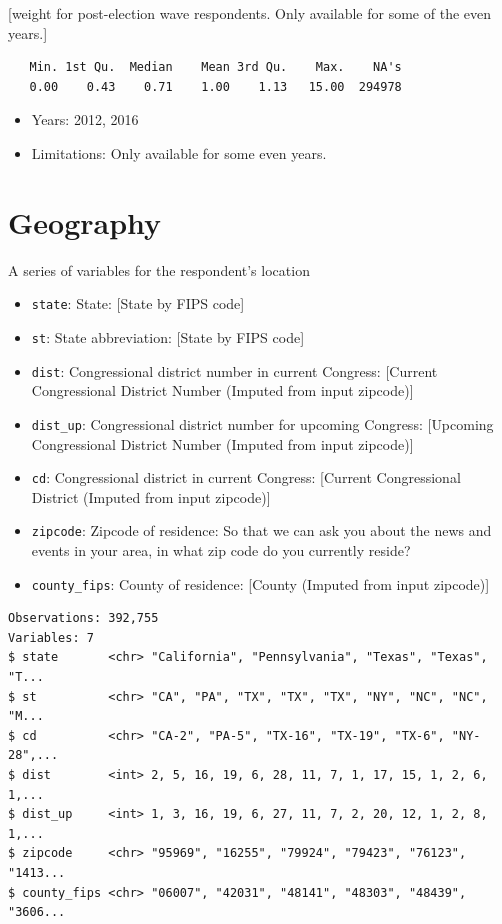 \documentclass[10pt,article,oneside]{memoir}
\theoremstyle{definition}
\begin{document}
{[}weight for post-election wave respondents. Only available for some of
the even years.{]}

\begin{verbatim}
   Min. 1st Qu.  Median    Mean 3rd Qu.    Max.    NA's 
   0.00    0.43    0.71    1.00    1.13   15.00  294978 
\end{verbatim}

\begin{itemize}
\tightlist
\item
  Years: 2012, 2016
\item
  Limitations: Only available for some even years.
\end{itemize}

\section{Geography}\label{geography}

A series of variables for the respondent's location

\begin{itemize}
\tightlist
\item
  \texttt{state}: State: {[}State by FIPS code{]}
\item
  \texttt{st}: State abbreviation: {[}State by FIPS code{]}
\item
  \texttt{dist}: Congressional district number in current Congress:
  {[}Current Congressional District Number (Imputed from input
  zipcode){]}
\item
  \texttt{dist\_up}: Congressional district number for upcoming
  Congress: {[}Upcoming Congressional District Number (Imputed from
  input zipcode){]}
\item
  \texttt{cd}: Congressional district in current Congress: {[}Current
  Congressional District (Imputed from input zipcode){]}
\item
  \texttt{zipcode}: Zipcode of residence: So that we can ask you about
  the news and events in your area, in what zip code do you currently
  reside?
\item
  \texttt{county\_fips}: County of residence: {[}County (Imputed from
  input zipcode){]}
\end{itemize}

\begin{verbatim}
Observations: 392,755
Variables: 7
$ state       <chr> "California", "Pennsylvania", "Texas", "Texas", "T...
$ st          <chr> "CA", "PA", "TX", "TX", "TX", "NY", "NC", "NC", "M...
$ cd          <chr> "CA-2", "PA-5", "TX-16", "TX-19", "TX-6", "NY-28",...
$ dist        <int> 2, 5, 16, 19, 6, 28, 11, 7, 1, 17, 15, 1, 2, 6, 1,...
$ dist_up     <int> 1, 3, 16, 19, 6, 27, 11, 7, 2, 20, 12, 1, 2, 8, 1,...
$ zipcode     <chr> "95969", "16255", "79924", "79423", "76123", "1413...
$ county_fips <chr> "06007", "42031", "48141", "48303", "48439", "3606...
\end{verbatim}
\end{document}
